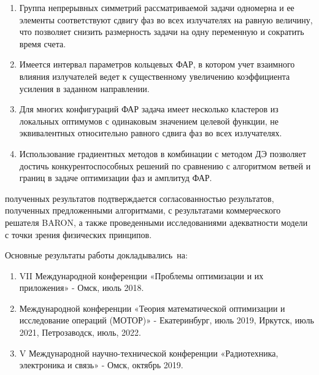 {}
\begin{enumerate}[beginpenalty=10000] %
  \item Группа непрерывных симметрий рассматриваемой задачи одномерна и ее элементы соответствуют сдвигу фаз во всех излучателях на равную величину, что позволяет снизить размерность задачи на одну переменную и сократить время счета.
  \item Имеется интервал параметров кольцевых ФАР, в котором учет взаимного влияния излучателей ведет к существенному увеличению коэффициента усиления в заданном направлении.
  \item Для многих конфигураций ФАР задача имеет несколько кластеров из локальных оптимумов с одинаковым значением целевой функции, не эквивалентных относительно равного сдвига фаз во всех излучателях.
  \item Использование градиентных методов в комбинации с методом ДЭ позволяет достичь конкурентоспособных решений по сравнению с алгоритмом ветвей и границ в задаче оптимизации фаз и амплитуд ФАР.
\end{enumerate}

{\reliability} полученных результатов подтверждается согласованностью  результатов, полученных предложенными алгоритмами, с результатами коммерческого решателя BARON, а также проведенными исследованиями адекватности модели с точки зрения физических принципов.


{\probation}
Основные результаты работы докладывались~на:
\begin{enumerate}[beginpenalty=10000] %
  \item VII Международной конференции «Проблемы оптимизации и их приложения» - Омск, июль 2018.
  \item Международной конференции «Теория математической оптимизации и исследование операций (МОТОР)» - Екатеринбург, июль 2019, Иркутск, июль 2021, Петрозаводск, июль, 2022.
  \item V Международной научно-технической конференции «Радиотехника, электроника и связь» - Омск, октябрь 2019.
\end{enumerate}

